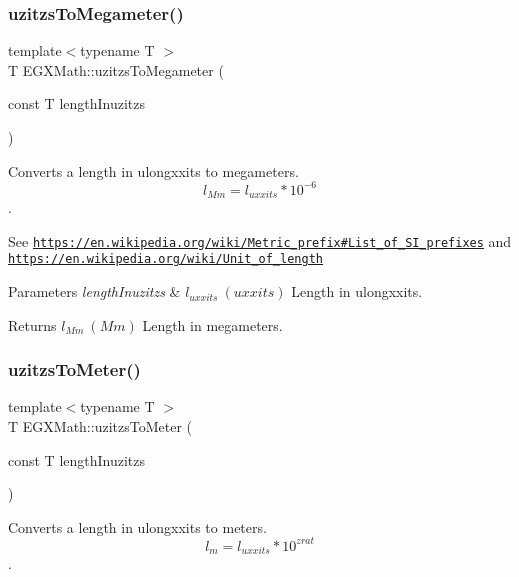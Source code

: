 \subsubsection{\texorpdfstring{uzitzs\+To\+Megameter()}{uzitzsToMegameter()}}
{\footnotesize\ttfamily template$<$typename T $>$ \\
T E\+G\+X\+Math\+::uzitzs\+To\+Megameter (\begin{DoxyParamCaption}\item[{const T}]{length\+Inuzitzs }\end{DoxyParamCaption})}



Converts a length in ulongxxits to megameters. \[ l_{Mm}=l_{uxxits} * 10^{-6} \]. 

See \href{https://en.wikipedia.org/wiki/Metric_prefix#List_of_SI_prefixes}{\tt https\+://en.\+wikipedia.\+org/wiki/\+Metric\+\_\+prefix\#\+List\+\_\+of\+\_\+\+S\+I\+\_\+prefixes} and \href{https://en.wikipedia.org/wiki/Unit_of_length}{\tt https\+://en.\+wikipedia.\+org/wiki/\+Unit\+\_\+of\+\_\+length} 
\begin{DoxyParams}{Parameters}
{\em length\+Inuzitzs} & $ l_{uxxits}\ (uxxits)$ Length in ulongxxits. \\
\hline
\end{DoxyParams}
\begin{DoxyReturn}{Returns}
$ l_{Mm}\ (Mm)$ Length in megameters. 
\end{DoxyReturn}
\mbox{\label{group___e_g_x_math-_conversions-_length_conversions-_non-_s_i-uzitzs-_s_i_gad256d80aa1424b503ded3fda023ee4dd}} 
\subsubsection{\texorpdfstring{uzitzs\+To\+Meter()}{uzitzsToMeter()}}
{\footnotesize\ttfamily template$<$typename T $>$ \\
T E\+G\+X\+Math\+::uzitzs\+To\+Meter (\begin{DoxyParamCaption}\item[{const T}]{length\+Inuzitzs }\end{DoxyParamCaption})}



Converts a length in ulongxxits to meters. \[ l_{m}=l_{uxxits} * 10^{zrat} \]. 



